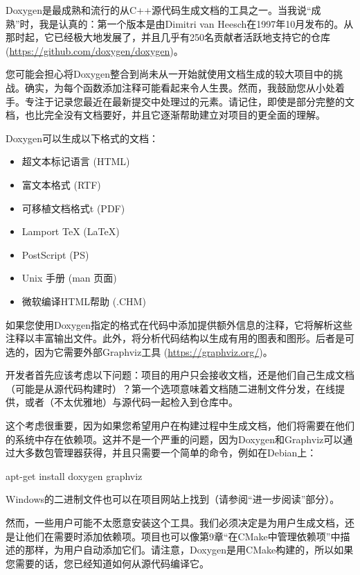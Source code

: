 Doxygen是最成熟和流行的从C++源代码生成文档的工具之一。当我说“成熟”时，我是认真的：第一个版本是由Dimitri van Heesch在1997年10月发布的。从那时起，它已经极大地发展了，并且几乎有250名贡献者活跃地支持它的仓库 (\url{https://github.com/doxygen/doxygen})。

您可能会担心将Doxygen整合到尚未从一开始就使用文档生成的较大项目中的挑战。确实，为每个函数添加注释可能看起来令人生畏。然而，我鼓励您从小处着手。专注于记录您最近在最新提交中处理过的元素。请记住，即使是部分完整的文档，也比完全没有文档要好，并且它逐渐帮助建立对项目的更全面的理解。

Doxygen可以生成以下格式的文档：

\begin{itemize}
\item
超文本标记语言 (HTML)

\item
富文本格式 (RTF)

\item
可移植文档格式t (PDF)

\item
Lamport TeX (LaTeX)

\item
PostScript (PS)

\item
Unix 手册 (man 页面)

\item
微软编译HTML帮助 (.CHM)
\end{itemize}

如果您使用Doxygen指定的格式在代码中添加提供额外信息的注释，它将解析这些注释以丰富输出文件。此外，将分析代码结构以生成有用的图表和图形。后者是可选的，因为它需要外部Graphviz工具 (\url{https://graphviz.org/})。

开发者首先应该考虑以下问题：项目的用户只会接收文档，还是他们自己生成文档（可能是从源代码构建时）？第一个选项意味着文档随二进制文件分发，在线提供，或者（不太优雅地）与源代码一起检入到仓库中。

这个考虑很重要，因为如果您希望用户在构建过程中生成文档，他们将需要在他们的系统中存在依赖项。这并不是一个严重的问题，因为Doxygen和Graphviz可以通过大多数包管理器获得，并且只需要一个简单的命令，例如在Debian上：

\begin{shell}
apt-get install doxygen graphviz
\end{shell}

Windows的二进制文件也可以在项目网站上找到（请参阅“进一步阅读”部分）。

然而，一些用户可能不太愿意安装这个工具。我们必须决定是为用户生成文档，还是让他们在需要时添加依赖项。项目也可以像第9章“在CMake中管理依赖项”中描述的那样，为用户自动添加它们。请注意，Doxygen是用CMake构建的，所以如果您需要的话，您已经知道如何从源代码编译它。

